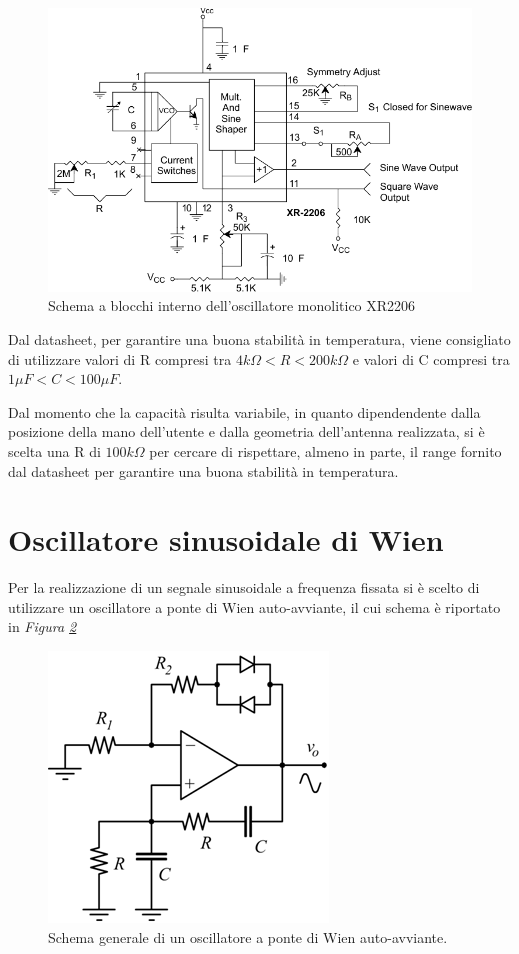 \documentclass[titlepage]{report}
\begin{document}
	\begin{figure}[h]
		\centering
		\includegraphics[scale=1]{Immagini/schema_xr2206.pdf}
		\caption{Schema a blocchi interno dell'oscillatore monolitico XR2206}
		\label{fig:sch_xr2206_}
	\end{figure}
	\newpage

	\noindent
	Dal datasheet, per garantire una buona stabilità in temperatura, viene consigliato di utilizzare valori di R compresi tra $4k\Omega < R < 200k\Omega$ e valori di C compresi tra $1\mu F < C < 100\mu F$.
	
	\noindent Dal momento che la capacità risulta variabile, in quanto dipendendente dalla posizione della mano dell'utente e dalla geometria dell'antenna realizzata, si è scelta una R di $100k\Omega$ per cercare di rispettare, almeno in parte, il range fornito dal datasheet per garantire una buona stabilità in temperatura. 
	
	
\section{Oscillatore sinusoidale di Wien}
	\label{sec:osc_wien}
	Per la realizzazione di un segnale sinusoidale a frequenza fissata si è scelto di utilizzare un oscillatore a ponte di Wien auto-avviante, il cui schema è riportato in \textit{Figura \ref{fig:sch_osc_wien}}
	
	\begin{figure}[h]
		\centering
		\includegraphics[scale=0.7]{Immagini/sch_osc_wien.png}
		\caption{Schema generale di un oscillatore a ponte di Wien auto-avviante.}
		\label{fig:sch_osc_wien}
	\end{figure}
\end{document}
